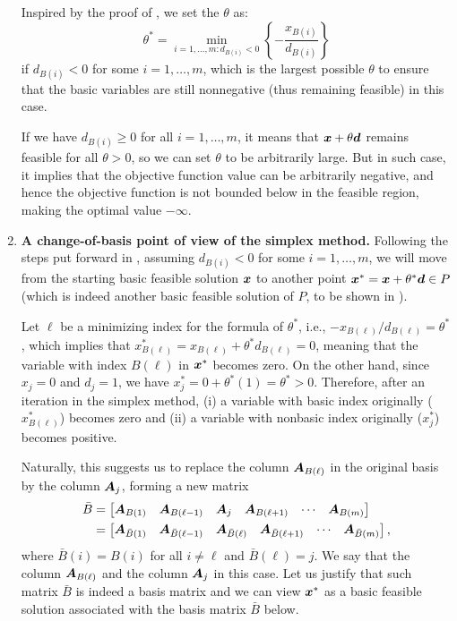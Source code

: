 \begin{enumerate}
Inspired by the proof of , we set the \(\theta\) as:
\[
\boxed{\theta^{*}=\min_{i=1,\dotsc,m:d_{B(i)}<0}\left\{-\frac{x_{B(i)}}{d_{B(i)}}\right\}}
\]
if \(d_{B(i)}<0\) for some \(i=1,\dotsc,m\), which is the largest possible
\(\theta\) to ensure that the basic variables are still nonnegative
(thus remaining feasible) in this case.

If we have \(d_{B(i)}\ge 0\) for all \(i=1,\dotsc,m\), it means that
\(\bm{x}+\theta\bm{d}\) remains feasible for all \(\theta>0\), so we can
set \(\theta\) to be arbitrarily large. But in such case, it implies that the
objective function value can be arbitrarily negative, and hence the objective
function is not bounded below in the feasible region, making the optimal value
\(-\infty\).
\item \textbf{A change-of-basis point of view of the simplex method.} Following
the steps put forward in , assuming
\(d_{B(i)}<0\) for some \(i=1,\dotsc,m\), we will move from the starting basic
feasible solution \(\bm{x}\) to another point
\(\bm{x}^{*}=\bm{x}+\theta^{*}\bm{d}\in P\) (which is indeed another basic
feasible solution of \(P\), to be shown in ).

Let \(\ell\) be a minimizing index for the formula of \(\theta^{*}\), i.e.,
\(-x_{B(\ell)}/d_{B(\ell)} =\theta^{*}\), which implies that
\(x_{B(\ell)}^{*}=x_{B(\ell)}+\theta^{*}d_{B(\ell)}=0\), meaning that the
variable with index \(B(\ell)\) in \(\bm{x}^*\) becomes zero.  On the other
hand, since \(x_j=0\) and \(d_j=1\), we have
\(x_j^{*}=0+\theta^{*}(1)=\theta^{*}>0\). Therefore, after an iteration in the
simplex method, (i) a variable with basic index originally
(\(x_{B(\ell)}^{*}\)) becomes zero and (ii) a variable with nonbasic index
originally (\(x_j^{*}\)) becomes positive.

Naturally, this suggests us to replace the column \(\bm{A}_{B(\ell)}\) in the
original basis by the column \(\bm{A}_j\), forming a new matrix
\begin{align*}
\bar{B}&=\begin{bmatrix}
\bm{A}_{B(1)}&\bm{A}_{B(\ell -1)}&\bm{A}_j&\bm{A}_{B(\ell+1)}&\cdots&\bm{A}_{B(m)}
\end{bmatrix} \\
&=\begin{bmatrix}
\bm{A}_{\bar{B}(1)}&\bm{A}_{\bar{B}(\ell -1)}&\bm{A}_{\bar{B}(\ell)}&\bm{A}_{\bar{B}(\ell+1)}
&\cdots&\bm{A}_{\bar{B}(m)}
\end{bmatrix},
\end{align*}
where \(\bar{B}(i)=B(i)\) for all \(i\ne\ell\) and \(\bar{B}(\ell)=j\).
We say that the column
\(\bm{A}_{B(\ell)}\)  and the column \(\bm{A}_j\)
 in this case. Let us justify that such matrix
\(\bar{B}\) is indeed a basis matrix and we can view \(\bm{x}^*\) as a basic
feasible solution associated with the basis matrix \(\bar{B}\) below.


\end{enumerate}
